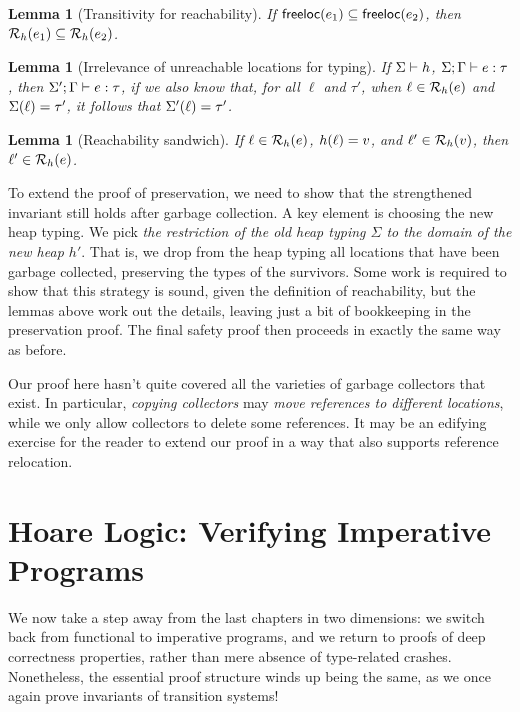 \documentclass{amsbook}
\newtheorem{lemma}[theorem]{Lemma}
\theoremstyle{definition}
\theoremstyle{remark}
\numberwithin{section}{chapter}
\numberwithin{equation}{chapter}
\begin{document}
\begin{lemma}[Transitivity for reachability]
  If $\mathsf{freeloc}(e_1) \subseteq \mathsf{freeloc}(e_2)$, then $\mathcal R_{h}(e_1) \subseteq \mathcal R_{h}(e_2)$.
\end{lemma}

\begin{lemma}[Irrelevance of unreachable locations for typing]
  If $\Sigma \vdash h$, $\Sigma; \Gamma \vdash e : \tau$, then $\Sigma'; \Gamma \vdash e : \tau$, if we also know that, for all $\ell$ and $\tau'$, when $\ell \in \mathcal R_{h}(e)$ and $\Sigma(\ell) = \tau'$, it follows that $\Sigma'(\ell) = \tau'$.
\end{lemma}

\begin{lemma}[Reachability sandwich]
  If $\ell \in \mathcal R_{h}(e)$, $h(\ell) = v$, and $\ell' \in \mathcal R_{h}(v)$, then $\ell' \in \mathcal R_{h}(e)$.
\end{lemma}

To extend the proof of preservation, we need to show that the strengthened invariant still holds after garbage collection.
A key element is choosing the new heap typing.
We pick \emph{the restriction of the old heap typing $\Sigma$ to the domain of the new heap $h'$}.
That is, we drop from the heap typing all locations that have been garbage collected, preserving the types of the survivors.
Some work is required to show that this strategy is sound, given the definition of reachability, but the lemmas above work out the details, leaving just a bit of bookkeeping in the preservation proof.
The final safety proof then proceeds in exactly the same way as before.

Our proof here hasn't quite covered all the varieties of garbage collectors that exist.
In particular, \emph{copying collectors} may \emph{move references to different locations}, while we only allow collectors to delete some references.
It may be an edifying exercise for the reader to extend our proof in a way that also supports reference relocation.



\chapter{Hoare Logic: Verifying Imperative Programs}

We now take a step away from the last chapters in two dimensions: we switch back from functional to imperative programs, and we return to proofs of deep correctness properties, rather than mere absence of type-related crashes.
Nonetheless, the essential proof structure winds up being the same, as we once again prove invariants of transition systems!
\end{document}

